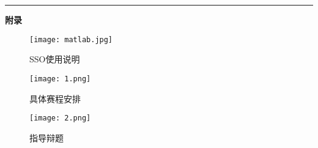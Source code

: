\documentclass[letterpaper, 12pt]{article}
\begin{document}
\hrule
\vspace{4mm}
\centerline{\huge\textbf{附录}}
\begin{figure}[htbp]
    \centering
    \begin{minipage}[b]{0.32\textwidth}
        \centering
        \texttt{[image: matlab.jpg]}
        \caption{SSO使用说明}
    \end{minipage}
    \begin{minipage}[b]{0.32\textwidth}
        \centering
        \texttt{[image: 1.png]}
        \caption{具体赛程安排}
    \end{minipage}
        \begin{minipage}[b]{0.32\textwidth}
        \centering
        \texttt{[image: 2.png]}
        \caption{指导辩题}
    \end{minipage}
\end{figure}
\end{document}

